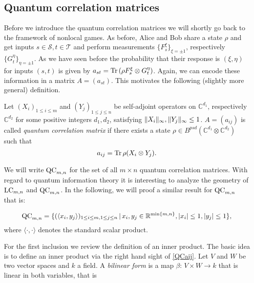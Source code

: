 \subsection{Quantum correlation matrices}
Before we introduce the quantum correlation matrices we will shortly go back to the framework of nonlocal games. As before, Alice and Bob share a state $ \rho $ and get inputs $ s \in \mathcal{S}, t \in \mathcal{T} $ and perform measurements $ \{ F_s^{\xi} \}_{\xi = \pm 1} $, respectively $ \{ G_t^{\eta} \}_{\eta = \pm 1} $.
As we have seen before the probability that their response is $ (\xi,\eta) $ for inputs $ (s,t) $ is given by 
$ a_{st} = \textup{Tr} \, {(\rho F_s^\xi \otimes G_t^\eta )}  $. Again, we can encode these information in a matrix $ A=(a_{st}) $. This motivates the following (slightly more general) definition. 
\begin{dfn}
	Let $ (X_i)_{1 \le i \le m } $ and $ (Y_j)_{1 \le j \le n} $ be self-adjoint operators on $ \mathbb{C}^{d_1} $, respectively $ \mathbb{C}^{d_2} $ for some positive integers $ d_1,d_2 $, satisfying $  \Vert {X_i} \Vert_{\infty},  \Vert {Y_j} \Vert_{\infty} \le 1 $. $ A = (a_{ij}) $ is called {\itshape quantum correlation matrix} if there exists a state $ \rho \in B^{psd}(\mathbb{C}^{d_1} \otimes \mathbb{C}^{d_2})$ such that 
	\begin{align}\label{QCaij}
	a_{ij} = \textup{Tr} \, {\rho (X_i \otimes Y_j)} .
	\end{align}
\end{dfn}
\noindent We will write $ \textup{QC}_{m,n} $ for the set of all $ m \times n $ quantum correlation matrices.
With regard to quantum information theory it is interesting to analyze the geometry of $ \textup{LC}_{m,n} $ and $ \textup{QC}_{m,n} $. In the following, we will proof a similar result for $ \textup{QC}_{m,n} $ that is: 
\begin{lemma}\label{LemQC}
	\begin{align}\label{EqQC}
		\textup{QC}_{m,n} = \{ (\langle x_i,y_j \rangle)_{1 \le i \le m, 1 \le j \le n} \,| \, x_i,y_j \in \mathbb{R}^{ \min \{m,n \} }, \vert x_i  \vert \le 1, \vert y_j \vert \le 1  \},
	\end{align}
	where $ \langle \cdot , \cdot \rangle $ denotes the standard scalar product. 
\end{lemma}
\noindent For the first inclusion we review the definition of an inner product. The basic idea is to define an inner product via the  right hand sight of \ref{QCaij}.
Let $ V $ and $ W $ be two vector spaces and $ k  $ a field. A {\itshape bilinear form} is a map $ \beta: \, V \times W \to k $ that is linear in both variables, that is 
